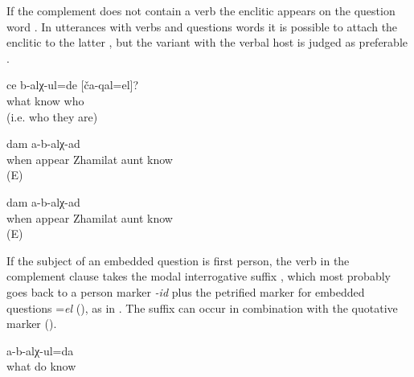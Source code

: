 If the complement does not contain a verb the enclitic appears on the question word . In utterances with verbs and questions words it is possible to attach the enclitic to the latter , but the variant with the verbal host is judged as preferable .
%
\begin{exe}
	\ex	\label{ex:How do you know them}
	\gll	ce	b-alχ-ul=de	[ča-qal=el]?\\
		what	know	who\\
	\glt	{} (i.e. who they are)

	\ex	\label{ex:‎I don't know when aunt Zhamilat was bornA}
	\gll	[ceqːel=el	hak'-ub-ce	žamilat	azi]	dam	a-b-alχ-ad\\
		when	appear	Zhamilat	aunt		know\\
	\glt	{} (E)

	\ex	\label{ex:‎I don't know when aunt Zhamilat was bornB}
	\gll	[ceqːel	hak'-ub-ce=jal	žamilat	azi]	dam	a-b-alχ-ad\\
		when	appear	Zhamilat	aunt		know\\
	\glt	{} (E)
\end{exe}

If the subject of an embedded question is first person, the verb in the complement clause takes the modal interrogative suffix , which most probably goes back to a person marker \textit{-id} plus the petrified marker for embedded questions =\textit{el} (), as in . The suffix can occur in combination with the quotative marker ().
%
\begin{exe}
	\ex	\label{ex:I do not know what to do}
	\gll	[ce	b-arq'-ide=l]	a-b-alχ-ul=da\\
		what	do	know\\
	\glt	{}
\end{exe}



